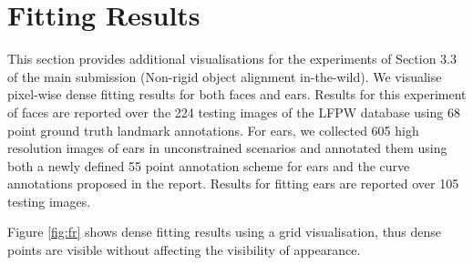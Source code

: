 
\section{Fitting Results}
\label{sec:fittingresults}

This section provides additional visualisations for the experiments of Section 3.3 of the main submission (Non-rigid object alignment in-the-wild). We visualise pixel-wise dense fitting results for both faces and ears. Results for this experiment of faces are reported over the 224 testing images of the LFPW database using 68 point ground truth landmark annotations. 
For ears, we collected 605 high resolution images of ears in unconstrained scenarios and annotated them using both a newly defined 55 point annotation scheme for ears and the curve annotations proposed in the report. Results for fitting ears are reported over 105 testing images.

Figure \ref{fig:fr} shows dense fitting results using a grid visualisation, thus dense points are visible without affecting the visibility of appearance.

